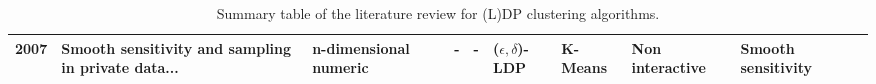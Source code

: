 \begin{landscape}
\begin{table}[ht]
\begin{adjustbox}{width=1.6\textwidth}
\begin{tabular}{rlllllllll}
        2007 \citep{nissim_smooth_2007}                 & Smooth sensitivity and sampling in private data... & n-dimensional numeric             & -                                                  & -                                                  & ($\epsilon, \delta$)-LDP & K-Means             & Non interactive & Smooth sensitivity               \\
        \bottomrule
      \end{tabular}
    \end{adjustbox}
    \caption{Summary table of the literature review for (L)DP clustering algorithms.}
    \label{tab:summary_table_kmeans}
  \end{table}


  \begin{table}[ht]
    \centering
    \begin{adjustbox}{width=1.6\textwidth}


\end{adjustbox}
\end{table}
\end{landscape}
